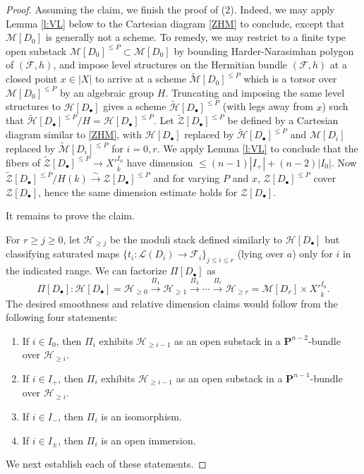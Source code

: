 \documentclass[reqno]{amsart}
\numberwithin{equation}{section}
\newcommand{\wt}[1]{\widetilde{#1}}
\newcommand{\ol}[1]{\overline{#1}}
\newcommand{\PP}{\mathbf{P}}
\newcommand{\isom}{\stackrel{\sim}{\to}}
\newcommand{\bu}{\bullet}
\newcommand{\ov}{\overline}
\newcommand\xr{\xrightarrow}
\newcommand\cF{\mathcal{F}}
\newcommand\cH{\mathcal{H}}
\newcommand\cL{\mathcal{L}}
\newcommand\cM{\mathcal{M}}
\newcommand\cZ{\mathcal{Z}}
\theoremstyle{remark}
\numberwithin{equation}{section}
\begin{document}
\begin{proof}
Assuming the claim, we finish the proof of (2). Indeed, we may apply Lemma \ref{l:VL} below to the Cartesian diagram \eqref{ZHM} to conclude, except that $\cM[D_{0}]$ is generally not a scheme. To remedy, we may restrict to a finite type open substack  $\cM[D_{0}]^{\le P}\subset \cM[D_{0}]$ by bounding Harder-Narasimhan polygon of $(\cF,h)$, and impose level structures on the Hermitian bundle $(\cF,h)$ at a closed point $x\in |X|$ to arrive at a scheme $\wt\cM[D_{0}]^{\le P}$ which is a torsor over $\cM[D_{0}]^{\le P}$ by an algebraic group $H$. Truncating and imposing the same level structures to $\cH[D_{\bu}]$ gives a  scheme $\wt\cH[D_{\bu}]^{\le P}$ (with legs away from $x$) such that $\wt\cH[D_{\bu}]^{\le P}/H=\cH[D_{\bu}]^{\le P}$. Let $\wt\cZ[D_{\bu}]^{\le P}$ be defined by a Cartesian diagram similar to \eqref{ZHM}, with $\cH[D_{\bu}]$ replaced by $\wt\cH[D_{\bu}]^{\le P}$ and $\cM[D_{i}]$ replaced by $\wt\cM[D_{i}]^{\le P}$ for $i=0,r$. We apply  Lemma \ref{l:VL} to conclude that the fibers of $\wt \cZ[D_{\bu}]^{\le P}\to X'^{I_{0}}_{\ol{k}}$ have dimension $\le (n-1)|I_{+}|+(n-2)|I_{0}|$. Now $\wt \cZ[D_{\bu}]^{\le P}/H(k)\isom \cZ[D_{\bu}]^{\le P}$ and for varying $P$ and $x$, $\cZ[D_{\bu}]^{\le P}$ cover $\cZ[D_{\bu}]$, hence the same dimension estimate holds for $\cZ[D_{\bu}]$.
%

It remains to prove the claim.

For $r\ge j\ge 0$, let $\cH_{\ge j}$ be the moduli stack defined similarly to $\cH[D_{\bu}]$ but classifying saturated maps $\{t_{i}: \cL(D_{i}) \to \cF_{i}\}_{j\le i\le r}$ (lying over $a$) only for $i$ in the indicated range. We can factorize $\Pi[D_{\bu}]$ as
\begin{equation}
\Pi[D_{\bu}]: \cH[D_{\bu}]=\cH_{\ge0} \xr{ \Pi_{1}} \cH_{\ge1}\xr{\Pi_{2} }\cdots \xr{ \Pi_{r}}\cH_{\ge r}=\cM[D_{r}]\times X'^{I_{0}}_{\ov k}.
\end{equation}
The desired smoothness and relative dimension claims would follow from the following four statements:
\begin{enumerate}
\item[($H0$)] If $i\in I_{0}$, then $\Pi_{i}$ exhibits $\cH_{\ge i-1}$ as an open substack in a $\PP^{n-2}$-bundle over $\cH_{\ge i}$.
\item[($H+$)] If $i\in I_{+}$, then $\Pi_{i}$ exhibits $\cH_{\ge i-1}$ as an open substack in a $\PP^{n-1}$-bundle over $\cH_{\ge i}$.
\item[($H-$)] If $i\in I_{-}$, then $\Pi_{i}$ is an isomorphism.
\item[($H\pm$)] If $i\in I_{\pm}$, then $\Pi_{i}$ is an open immersion.
\end{enumerate}
We next establish each of these statements. 


\end{proof}
\end{document}
